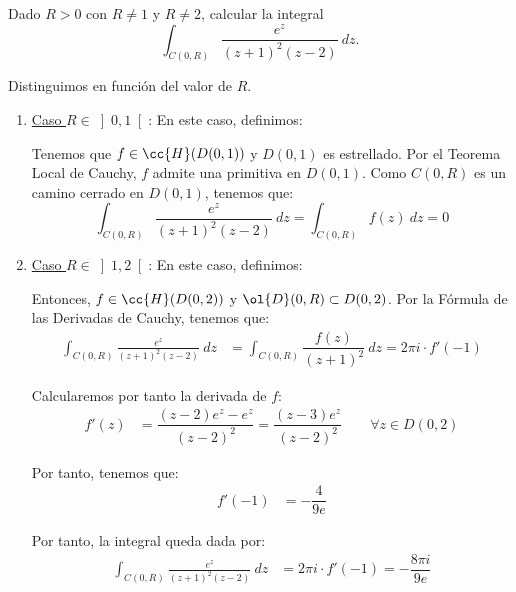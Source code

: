 \documentclass[12pt]{article}
\begin{document}
    \begin{ejercicio}[2 puntos] Dado $R > 0$ con $R \neq 1$ y $R \neq 2$, calcular la integral
        $$\int_{C(0,R)} \frac{e^z}{(z + 1)^2(z - 2)}\ dz.$$

        Distinguimos en función del valor de $R$.
        \begin{enumerate}
            \item \ul{Caso $R\in \left]0,1\right[$}: En este caso, definimos:

            Tenemos que $f\in \cc{H}(D(0, 1))$ y $D(0,1)$ es estrellado. Por el Teorema Local de Cauchy, $f$ admite una primitiva en $D(0,1)$. Como $C(0,R)$ es un camino cerrado en $D(0,1)$, tenemos que:
            \begin{equation*}
                \int_{C(0,R)} \frac{e^z}{(z + 1)^2(z - 2)}\ dz
                = \int_{C(0,R)} f(z)\ dz
                = 0
            \end{equation*}

            \item \ul{Caso $R\in \left]1,2\right[$}: En este caso, definimos:

            Entonces, $f\in \cc{H}(D(0, 2))$ y $\ol{D}(0,R)\subset D(0, 2)$. Por la Fórmula de las Derivadas de Cauchy, tenemos que:
            \begin{align*}
                \int_{C(0,R)} \frac{e^z}{(z + 1)^2(z - 2)}\ dz &= \int_{C(0,R)} \dfrac{f(z)}{(z + 1)^2}\ dz = 2\pi i \cdot f'(-1)
            \end{align*}

            Calcularemos por tanto la derivada de $f$:
            \begin{align*}
                f'(z) &= \dfrac{(z - 2)e^z - e^z}{(z - 2)^2} = \dfrac{(z - 3)e^z}{(z - 2)^2}\qquad \forall z \in D(0, 2)
            \end{align*}

            Por tanto, tenemos que:
            \begin{align*}
                f'(-1) &= -\dfrac{4}{9e}
            \end{align*}

            Por tanto, la integral queda dada por:
            \begin{align*}
                \int_{C(0,R)} \frac{e^z}{(z + 1)^2(z - 2)}\ dz &= 2\pi i \cdot f'(-1) = -\dfrac{8\pi i}{9e}
            \end{align*}


\end{enumerate}
\end{ejercicio}
\end{document}
